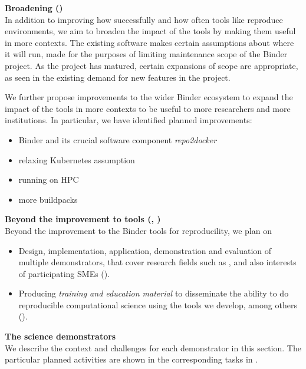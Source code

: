 \medskip
\noindent\textbf{Broadening  ()}\\
In addition to improving how successfully and how often tools like \repotodocker{} reproduce environments,
we aim to broaden the impact of the tools by making them useful in more contexts.
The existing software makes certain assumptions about where it will run,
made for the purposes of limiting maintenance scope of the Binder project.
As the project has matured, certain expansions of scope are appropriate,
as seen in the existing demand for new features in the project.

We further propose improvements to the wider Binder ecosystem
to expand the impact of the tools in more contexts to be useful to more researchers
and more institutions.
In particular, we have identified planned improvements:

\begin{itemize}
  \item Binder and its crucial software component \emph{repo2docker}
  \item relaxing Kubernetes assumption
  \item running on HPC
  \item more buildpacks

\end{itemize}

\medskip\noindent\textbf{Beyond the improvement to \TheProject tools
  (, )}\\
Beyond the improvement to the Binder tools for reproducility, we plan on
\begin{itemize}
\item Design, implementation, application, demonstration and
  evaluation of multiple demonstrators, that cover research fields such as
  ,
  and also interests of participating SMEs ().
\item Producing \emph{training and education material} to disseminate
  the ability to do reproducible computational science using the tools
  we develop, among others ().
\end{itemize}

\medskip
\noindent
\textbf{The science
  demonstrators}\label{sec:science-demonstrators-in-concept}\\

We describe the context and challenges for each demonstrator in this
section. The particular planned activities are shown in the
corresponding tasks in .\\

